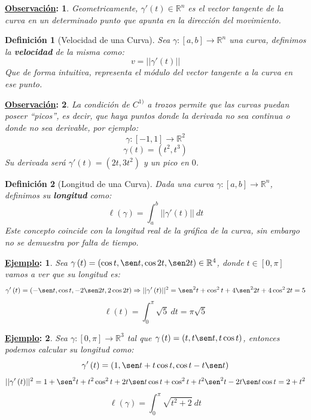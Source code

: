\documentclass[10pt,a4paper,openright]{book}
\theoremstyle{break}
\newtheorem*{defi}{Definición}
\newtheorem*{obs}{\underline{Observación}:}
\newtheorem*{ej}{\underline{Ejemplo}:}
\newcommand{\dif}[1]{\ d#1}
\begin{document}
\begin{obs}
Geometricamente, $\gamma'\left( t \right) \in \mathbb{R}^n$ es el vector tangente de la curva en un determinado punto que apunta en la dirección del movimiento.
\end{obs}

\begin{defi}[Velocidad de una Curva]
Sea $\gamma:[a,b]\rightarrow \mathbb{R}^n$ una curva, definimos la \textbf{velocidad} de la misma como: 
$$v = \lvert \lvert \gamma'\left( t \right) \rvert \rvert$$
Que de forma intuitiva, representa el módulo del vector tangente a la curva en ese punto.
\end{defi}

\begin{obs}
La condición de $C^{1)}$ a trozos permite que las curvas puedan poseer ``picos'', es decir, que haya puntos donde la derivada no sea continua o donde no sea derivable, por ejemplo: 
$$\gamma: \left[ -1, 1 \right] \rightarrow \mathbb{R}^2$$
$$\gamma \left( t \right) = \left( t^2, t^3 \right) $$
Su derivada será $\gamma'\left( t \right) = \left( 2t, 3t^2 \right)$ y un pico en $0$.
\end{obs}

\begin{defi}[Longitud de una Curva]
Dada una curva $\gamma:[a,b]\rightarrow \mathbb{R}^n$, definimos su \textbf{longitud} como:
$$\ell\left( \gamma \right) = \int_{a}^{b} \lvert \lvert \gamma'\left( t \right) \rvert \rvert \dif{t}$$
Este concepto coincide con la longitud real de la gráfica de la curva, sin embargo no se demuestra por falta de tiempo.
\end{defi}

\begin{ej}
Sea $\gamma\left( t \right) = \left( \cos t, \sen t, \cos 2t, \sen 2t \right) \in \mathbb{R}^4$, donde $t \in \left[ 0, \pi \right]$ vamos a ver que su longitud es:
$$\gamma'\left( t \right) = \left( -\sen t, \cos t, -2\sen 2t, 2\cos 2t\right) \Rightarrow \lvert \lvert \gamma'\left( t \right) \rvert \rvert^2 = \sen^2 t + \cos^2 t + 4\sen^2 2t + 4 \cos^2 2t = 5$$
$$\ell \left( t \right) = \int_{0}^{\pi} \sqrt{5} \dif{t} = \pi\sqrt{5} $$
\end{ej}
\begin{ej}
Sea $\gamma: \left[ 0, \pi \right] \rightarrow \mathbb{R}^3$ tal que $\gamma \left( t \right) = \left( t, t\sen t, t \cos t \right) $, entonces podemos calcular su longitud como:
$$\gamma'\left( t \right) = \left( 1, \sen t + t\cos t, \cos t - t \sen t\right) $$
$$\lvert \lvert \gamma'\left( t \right) \rvert \rvert^2 = 1 + \sen^2 t + t^2 \cos^2 t + 2t \sen t \cos t + \cos^2 t + t^2 \sen^2 t - 2t \sen t \cos t = 2 + t^2$$
$$\ell \left( \gamma \right) = \int_{0}^{\pi} \sqrt{t^2 + 2} \dif{t}$$
\end{ej}
\end{document}
